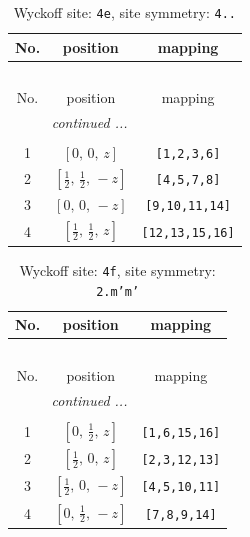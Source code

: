 \documentclass[fleqn,8pt]{jsarticle}
\begin{document}
\begin{longtable}{ccc}
\caption{Wyckoff site: {\tt 4e}, site symmetry: {\tt 4..}}
 \\
 \hline \hline
No. & position & mapping \\ \hline \endfirsthead

\multicolumn{2}{l}{\tablename\ \thetable{}} \\
 \hline \hline
No. & position & mapping \\ \hline \endhead

 \hline \hline
\multicolumn{2}{r}{\footnotesize\it continued ...} \\ \endfoot

 \hline \hline
\multicolumn{2}{r}{} \\ \endlastfoot

1 & $\left[ 0,\, 0,\, z \right]$ & {\tt [1,2,3,6]} \\ \hline
2 & $\left[ \frac{1}{2},\, \frac{1}{2},\, - z \right]$ & {\tt [4,5,7,8]} \\ \hline
3 & $\left[ 0,\, 0,\, - z \right]$ & {\tt [9,10,11,14]} \\ \hline
4 & $\left[ \frac{1}{2},\, \frac{1}{2},\, z \right]$ & {\tt [12,13,15,16]} \\
\end{longtable}
\renewcommand{\arraystretch}{1.2}
\begin{longtable}{ccc}
\caption{Wyckoff site: {\tt 4f}, site symmetry: {\tt 2.m'm'}}
 \\
 \hline \hline
No. & position & mapping \\ \hline \endfirsthead

\multicolumn{2}{l}{\tablename\ \thetable{}} \\
 \hline \hline
No. & position & mapping \\ \hline \endhead

 \hline \hline
\multicolumn{2}{r}{\footnotesize\it continued ...} \\ \endfoot

 \hline \hline
\multicolumn{2}{r}{} \\ \endlastfoot

1 & $\left[ 0,\, \frac{1}{2},\, z \right]$ & {\tt [1,6,15,16]} \\ \hline
2 & $\left[ \frac{1}{2},\, 0,\, z \right]$ & {\tt [2,3,12,13]} \\ \hline
3 & $\left[ \frac{1}{2},\, 0,\, - z \right]$ & {\tt [4,5,10,11]} \\ \hline
4 & $\left[ 0,\, \frac{1}{2},\, - z \right]$ & {\tt [7,8,9,14]} \\
\end{longtable}
\end{document}
